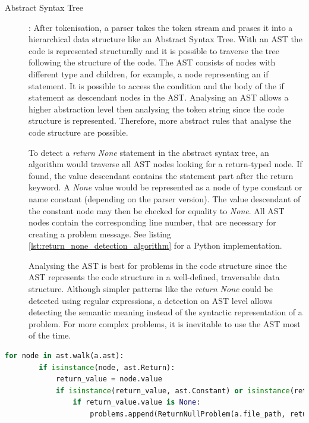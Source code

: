\begin{description}
    \item[Abstract Syntax Tree]: After tokenisation, a parser takes the token stream and prases it into a hierarchical data structure like an Abstract Syntax Tree. With an AST the code is represented structurally and it is possible to traverse the tree following the structure of the code. The AST consists of nodes with different type and children, for example, a node representing an if statement. It is possible to access the condition and the body of the if statement as descendant nodes in the AST. Analysing an AST allows a higher abstraction level then analysing the token string since the code structure is represented. Therefore, more abstract rules that analyse the code structure are possible.

    To detect a \textit{return None} statement in the abstract syntax tree, an algorithm would traverse all AST nodes looking for a return-typed node. If found, the value descendant contains the statement part after the return keyword. A \textit{None} value would be represented as a node of type constant or name constant (depending on the parser version). The value descendant of the constant node may then be checked for equality to \textit{None}. All AST nodes contain the corresponding line number, that are necessary for creating a problem message. See listing \ref{lst:return_none_detection_algorithm} for a Python implementation. 


    Analysing the AST is best for problems in the code structure since the AST represents the code structure in a well-defined, traversable data structure. Although simpler patterns like the \textit{return None} could be detected using regular expressions, a detection on AST level allows detecting the semantic meaning instead of the syntactic representation of a problem. For more complex problems, it is inevitable to use the AST most of the time.
\end{description}

\begin{minipage}[c]{\linewidth}
    \begin{lstlisting}[language=Python, label=lst:return_none_detection_algorithm, caption={Detecting RETURN NONE problems by analsing the AST data structure.}]
    for node in ast.walk(a.ast):
        if isinstance(node, ast.Return):
            return_value = node.value
            if isinstance(return_value, ast.Constant) or isinstance(return_value, ast.NameConstant):
                if return_value.value is None:
                    problems.append(ReturnNullProblem(a.file_path, return_value.lineno))\end{lstlisting}
    \end{minipage}

